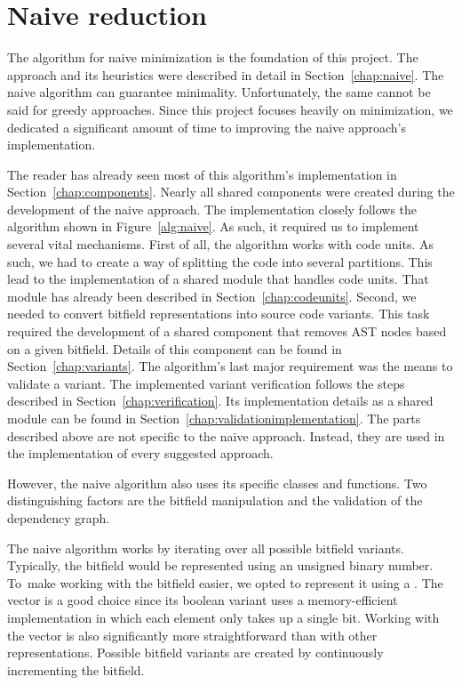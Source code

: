 \section{Naive reduction}\label{chap:naiveimplementation}

The algorithm for naive minimization is the foundation of this project. 
The approach and its heuristics were described in detail in 
Section~\ref{chap:naive}. 
The naive algorithm can guarantee minimality. Unfortunately, the same 
cannot be said for greedy approaches. 
Since this project focuses heavily on minimization, we dedicated 
a significant amount of time to improving the naive approach's 
implementation.

The reader has already seen most of this algorithm's implementation in 
Section~\ref{chap:components}. 
Nearly all shared components were created during the development of 
the naive approach. 
The implementation closely follows the algorithm shown in 
Figure~\ref{alg:naive}. 
As such, it required us to implement several vital mechanisms. 
First of all, the algorithm works with code units. 
As such, we had to create a way of splitting the code into several 
partitions. 
This lead to the implementation of a shared module that handles code units. 
That module has already been described in Section~\ref{chap:codeunits}. 
Second, we needed to convert bitfield representations into source code 
variants. 
This task required the development of a shared component that removes AST 
nodes based on a given bitfield. 
Details of this component can be found in Section~\ref{chap:variants}. 
The algorithm's last major requirement was the means to validate a variant. 
The implemented variant verification follows the steps described in 
Section~\ref{chap:verification}. 
Its implementation details as a shared module can be found in 
Section~\ref{chap:validationimplementation}.
The parts described above are not specific to the naive approach. 
Instead, they are used in the implementation of every suggested approach. 

However, the naive algorithm also uses its specific classes and functions. 
Two distinguishing factors are the bitfield manipulation and the validation 
of the dependency graph.

The naive algorithm works by iterating over all possible bitfield variants. 
Typically, the bitfield would be represented using an unsigned binary 
number. 
To~make working with the bitfield easier, we opted to represent it using 
a . 
The vector is a good choice since its boolean variant uses 
a memory-efficient implementation in which each element only takes up 
a single bit. 
Working with the vector is also significantly more straightforward than 
with other representations. 
Possible bitfield variants are created by continuously incrementing 
the bitfield. 

